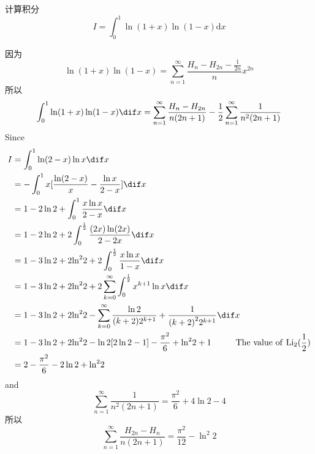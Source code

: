 \documentclass[color=green,titlestyle=hang]{elegantbook}%
\begin{document}
\begin{exercise}计算积分\[I=\int_0^1 \ln (1 + x)\ln (1 - x) \textrm{d}x\]\end{exercise}\begin{Solution}因为\[\ln (1 + x)\ln (1 - x) = \sum\limits_{n = 1}^\infty  {\frac{{{H_n} - {H_{2n}} - \frac{1}{{2n}}}}{n}{x^{2n}}} \]
所以\[\int_0^1 {\ln (1 + x)\ln (1 - x)} \dif x = \sum\limits_{n = 1}^\infty  {\frac{{{H_n} - {H_{2n}}}}{{n(2n + 1)}}}  - \frac{1}{2}\sum\limits_{n = 1}^\infty  {\frac{1}{{{n^2}(2n + 1)}}} \]
Since\begin{align*}
I &= \int_0^1 {\ln (2 - x)\ln x} \dif x\\
& =  - \int_0^1 {x[\frac{{\ln (2 - x)}}{x} - \frac{{\ln x}}{{2 - x}}]} \dif x\\
&= 1 - 2\ln 2 + \int_0^1 {\frac{{x\ln x}}{{2 - x}}} \dif x\\
& = 1 - 2\ln 2 + 2\int_0^{\frac{1}{2}} {\frac{{(2x)\ln (2x)}}{{2 - 2x}}} \dif x\\
& = 1 - 3\ln 2 + 2{\ln ^2}2 + 2\int_0^{\frac{1}{2}} {\frac{{x\ln x}}{{1 - x}}} \dif x\\
&= 1 - 3\ln 2 + 2{\ln ^2}2 + 2\sum\limits_{k = 0}^\infty  {\int_0^{\frac{1}{2}} {{x^{k + 1}}\ln x} } \dif x\\
&= 1 - 3\ln 2 + 2{\ln ^2}2 - \sum\limits_{k = 0}^\infty  {\frac{{\ln 2}}{{(k + 2){2^{k + 1}}}} + \frac{1}{{{{(k + 2)}^2}{2^{k + 1}}}}} \dif x\\
&= 1 - 3\ln 2 + 2{\ln ^2}2 - \ln 2[2\ln 2 - 1] - \frac{{{\pi ^2}}}{6} + {\ln ^2}2 + 1\hspace{10mm}{\rm{        The~ value~ of ~ L}}{{\rm{i}}_2}(\frac{1}{2})\\
& = 2 - \frac{{{\pi ^2}}}{6} - 2\ln 2 + {\ln ^2}2
\end{align*}
and \[\sum\limits_{n = 1}^\infty  {\frac{1}{{{n^2}(2n + 1)}}}  = \frac{{{\pi ^2}}}{6} + 4\ln 2 - 4\]
所以\[\sum\limits_{n = 1}^\infty  {\frac{{{H_{2n}} - {H_n}}}{{n(2n + 1)}}}  = \frac{{{\pi ^2}}}{{12}} - {\ln ^2}2\]\end{Solution}		
\end{document}

